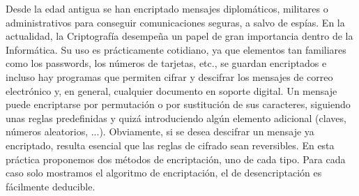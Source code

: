 Desde la edad antigua se han encriptado mensajes diplomáticos, militares o administrativos para conseguir comunicaciones seguras, a salvo de espías. En la actualidad, la Criptografía desempeña un papel de gran importancia dentro de la Informática. Su uso es prácticamente cotidiano, ya que elementos tan familiares como los passwords, los números de tarjetas, etc., se guardan encriptados e incluso hay programas que permiten cifrar y descifrar los mensajes de correo electrónico y, en general, cualquier documento en soporte digital. Un mensaje puede encriptarse por permutación o por sustitución de sus caracteres, siguiendo unas reglas predefinidas y quizá introduciendo algún elemento adicional (claves, números aleatorios, ...). Obviamente, si se desea descifrar un mensaje ya encriptado, resulta esencial que las reglas de cifrado sean reversibles. En esta práctica proponemos dos métodos de encriptación, uno de cada tipo. Para cada caso solo mostramos el algoritmo de encriptación, el de desencriptación es fácilmente deducible. 